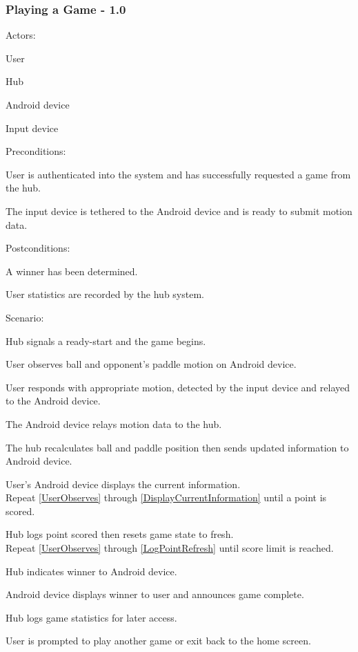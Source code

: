 \documentclass[12pt]{article}
\newenvironment{itemize*}%
  {\begin{itemize}%
  	\setlength{\parsep}{0pt}
    \setlength{\itemsep}{0pt}%
    \setlength{\parskip}{0pt}}%
  {\end{itemize}}
\newenvironment{enumerate*}%
  {\begin{enumerate}%
  	\setlength{\parsep}{0pt}
    \setlength{\itemsep}{0pt}%
    \setlength{\parskip}{0pt}}%
  {\end{enumerate}}
\begin{document}
\subsubsection{Playing a Game - 1.0}
Actors:
\begin{itemize*}
\item User
\item Hub
\item Android device
\item Input device
\end{itemize*}
Preconditions:
\begin{itemize*}
\item User is authenticated into the system and has successfully requested a game from the hub.
\item The input device is tethered to the Android device and is ready to submit motion data.
\end{itemize*}
Postconditions:
\begin{itemize*}
\item A winner has been determined.
\item User statistics are recorded by the hub system.
\end{itemize*}
Scenario:
\begin{enumerate*}
\item Hub signals a ready-start and the game begins.
\item \label{UserObserves}User observes ball and opponent's paddle motion on Android device.
\item User responds with appropriate motion, detected by the input device and relayed to the Android device.
\item The Android device relays motion data to the hub.
\item \label{HubUpdateGame}The hub recalculates ball and paddle position then sends updated information to Android device.
\item \label{DisplayCurrentInformation}User's Android device displays the current information.\\
Repeat \ref{UserObserves} through \ref{DisplayCurrentInformation} until a point is scored.
\item \label{LogPointRefresh}Hub logs point scored then resets game state to fresh.\\
Repeat \ref{UserObserves} through \ref{LogPointRefresh} until score limit is reached.
\item \label{AnnounceWinner}Hub indicates winner to Android device.
\item Android device displays winner to user and announces game complete.
\item Hub logs game statistics for later access.
\item User is prompted to play another game or exit back to the home screen.
\end{enumerate*}
\end{document}
